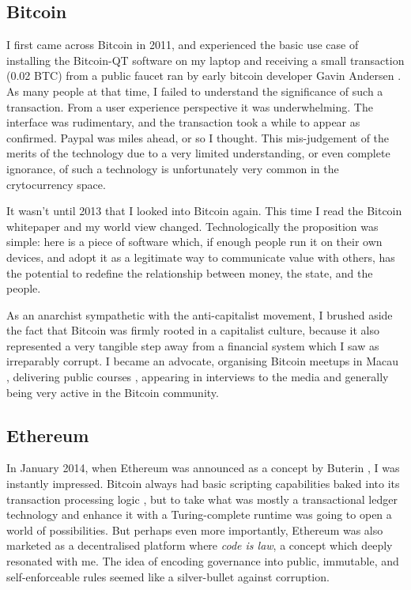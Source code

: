\subsection{Bitcoin}

I first came across Bitcoin in 2011, and experienced the basic use case of installing the Bitcoin-QT software on my laptop and receiving a small transaction (0.02 BTC) from a public faucet ran by early bitcoin developer Gavin Andersen \cite{lucasHowGavinAndresen2022}. As many people at that time, I failed to understand the significance of such a transaction. From a user experience perspective it was underwhelming.  The interface was rudimentary, and the transaction took a while to appear as confirmed. Paypal was miles ahead, or so I thought. This mis-judgement of the merits of the technology due to a very limited understanding, or even complete ignorance, of such a technology is unfortunately very common in the crytocurrency space.

It wasn't until 2013 that I looked into Bitcoin again. This time I read the Bitcoin whitepaper \cite{nakamotoBitcoinPeertopeerElectronic2008} and my world view changed. Technologically the proposition was simple: here is a piece of software which, if enough people run it on their own devices, and adopt it as a legitimate way to communicate value with others, has the potential to redefine the relationship between money, the state, and the people.

As an anarchist sympathetic with the anti-capitalist movement, I brushed aside the fact that Bitcoin was firmly rooted in a capitalist culture, because it also represented a very tangible step away from a financial system which I saw as irreparably corrupt. I became an advocate, organising Bitcoin meetups in Macau \cite{BitcoinMacau2024}, delivering public courses \cite{mouraUSJHoldCourse2021}, appearing in interviews to the media \cite{tdmportuguesenewsprogramsReportagemJornalistaLina2015} \cite{reisBitcoinDuasFaces2017} and generally being very active in the Bitcoin community.

\subsection{Ethereum}

In January 2014, when Ethereum was announced as a concept by Buterin \citeyear{buterinEthereumNextGenerationCryptocurrency2014}, I was instantly impressed. Bitcoin always had basic scripting capabilities baked into its transaction processing logic \cite{ScriptBitcoinWiki2024}, but to take what was mostly a transactional ledger technology and enhance it with a Turing-complete runtime was going to open a world of possibilities. But perhaps even more importantly, Ethereum was also marketed as a decentralised platform where \emph{\gls{code is law}}, a concept which deeply resonated with me. The idea of encoding governance into public, immutable, and self-enforceable rules seemed like a silver-bullet against corruption.

